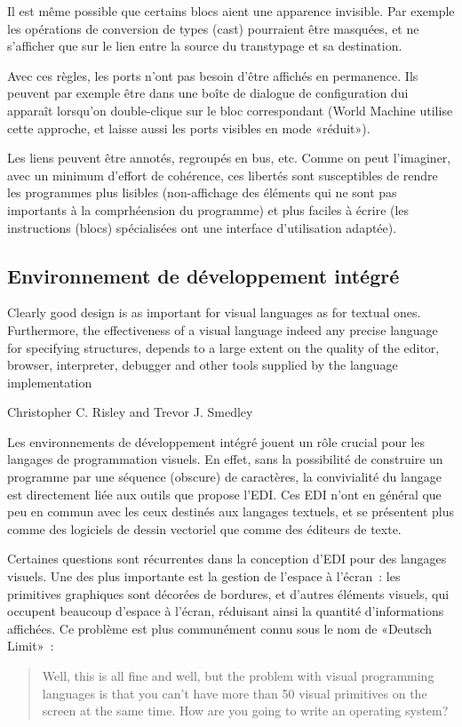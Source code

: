 \documentclass{article}
\begin{document}
Il est même possible que certains blocs aient une apparence invisible. Par exemple les opérations de conversion de types (cast) pourraient
être masquées, et ne s'afficher que sur le lien entre la source du transtypage et sa destination.

Avec ces règles, les ports n'ont pas besoin d'être affichés en permanence. Ils peuvent par exemple être dans une boîte de dialogue de
configuration dui apparaît lorsqu'on double-clique sur le bloc correspondant (World Machine utilise cette approche, et laisse aussi les
ports visibles en mode «réduit»).

Les liens peuvent être annotés, regroupés en bus, etc. Comme on peut l'imaginer, avec un minimum d'effort de cohérence, ces libertés sont
susceptibles de rendre les programmes plus lisibles (non-affichage des éléments qui ne sont pas importants à la comprhéension du programme)
et plus faciles à écrire (les instructions (blocs) spécialisées ont une interface d'utilisation adaptée).

\subsection{Environnement de développement intégré}

{
  \setlength{\epigraphwidth}{0.85\linewidth}
  \renewcommand{\textflush}{void}
  \renewcommand{\epigraphflush}{center}
  \epigraph{
    Clearly good design is as important for visual languages as for textual ones. Furthermore, the effectiveness of a visual language indeed
    any precise language for specifying structures, depends to a large extent on the quality of the editor, browser, interpreter, debugger and
    other tools supplied by the language implementation
  }{Christopher C. Risley and Trevor J. Smedley \cite{the-editor-is-as-important-as-the-language}}
}

Les environnements de développement intégré jouent un rôle crucial pour les langages de programmation visuels. En effet, sans la possibilité
de construire un programme par une séquence (obscure) de caractères, la convivialité du langage est directement liée aux outils que propose
l'EDI. Ces EDI n'ont en général que peu en commun avec les ceux destinés aux langages textuels, et se présentent plus comme des logiciels de
dessin vectoriel que comme des éditeurs de texte.

Certaines questions sont récurrentes dans la conception d'EDI pour des langages visuels. Une des plus importante est la gestion de l'espace
à l'écran~: les primitives graphiques sont décorées de bordures, et d'autres éléments visuels, qui occupent beaucoup d'espace à l'écran,
réduisant ainsi la quantité d'informations affichées. Ce problème est plus communément connu sous le nom de «Deutsch
Limit»\cite{deutsch-limit}~:
\begin{quotation}
  Well, this is all fine and well, but the problem with visual programming languages is that you can’t have more than 50 visual primitives
  on the screen at the same time. How are you going to write an operating system?
\end{quotation}
\end{document}
